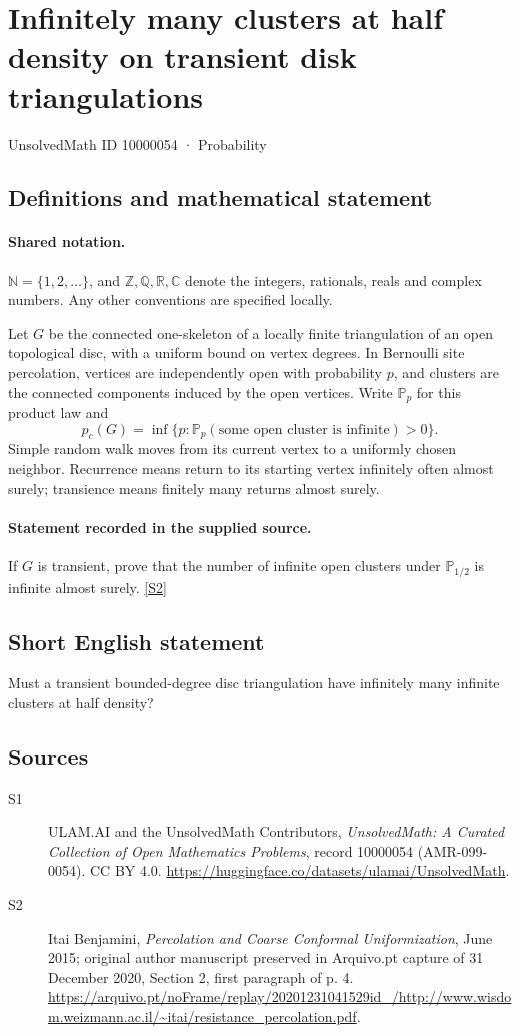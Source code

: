 \documentclass[11pt]{article}
\newcommand{\sref}[2]{\hyperlink{source:#1:#2}{[S#2]}}
\begin{document}
\setcounter{section}{10000053}
\section{Infinitely many clusters at half density on transient disk triangulations}\label{10000054}
{\small\sffamily UnsolvedMath ID 10000054 · Probability}
\subsection{Definitions and mathematical statement}

\paragraph{Shared notation.}$\mathbb N=\{1,2,\ldots\}$, and $\mathbb Z,\mathbb Q,\mathbb R,\mathbb C$ denote the integers, rationals, reals and complex numbers. Any other conventions are specified locally.


Let $G$ be the connected one-skeleton of a locally finite triangulation of an open topological disc, with a uniform bound on vertex degrees. In Bernoulli site percolation, vertices are independently open with probability $p$, and clusters are the connected components induced by the open vertices. Write $\mathbb P_p$ for this product law and
\[p_c(G)=\inf\{p:\mathbb P_p(\text{some open cluster is infinite})>0\}.\]
Simple random walk moves from its current vertex to a uniformly chosen neighbor. Recurrence means return to its starting vertex infinitely often almost surely; transience means finitely many returns almost surely.
\paragraph{Statement recorded in the supplied source.}
If $G$ is transient, prove that the number of infinite open clusters under $\mathbb P_{1/2}$ is infinite almost surely. \sref{10000054}{2}
\subsection{Short English statement}
Must a transient bounded-degree disc triangulation have infinitely many infinite clusters at half density?
\subsection{Sources}
\begin{description}
\item[\hypertarget{source:10000054:1}{S1}] ULAM.AI and the UnsolvedMath Contributors, \emph{UnsolvedMath: A Curated Collection of Open Mathematics Problems}, record 10000054 (AMR-099-0054). CC BY 4.0. \url{https://huggingface.co/datasets/ulamai/UnsolvedMath}.
\item[\hypertarget{source:10000054:2}{S2}] Itai Benjamini, \emph{Percolation and Coarse Conformal Uniformization}, June 2015; original author manuscript preserved in Arquivo.pt capture of 31 December 2020, Section 2, first paragraph of p. 4. \url{https://arquivo.pt/noFrame/replay/20201231041529id_/http://www.wisdom.weizmann.ac.il/~itai/resistance_percolation.pdf}.
\end{description}
\label{end:10000054}
\end{document}
